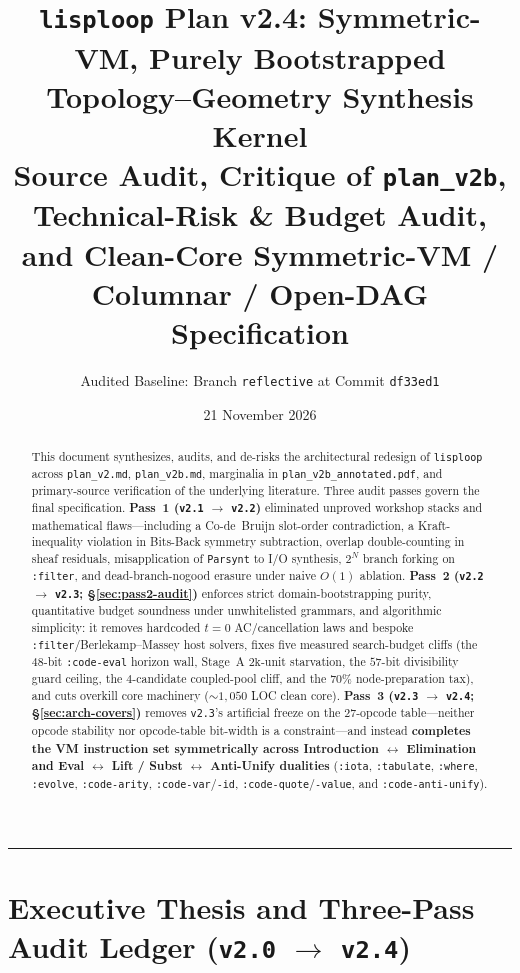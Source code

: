 \documentclass[12pt]{article}
\title{\vspace{-1.2em}\textbf{\Large \texttt{lisploop} Plan v2.4: Symmetric-VM, Purely Bootstrapped\\[0.12em] Topology--Geometry Synthesis Kernel}\\[0.35em]
\normalsize Source Audit, Critique of \texttt{plan\_v2b}, Technical-Risk \& Budget Audit,\\
and Clean-Core Symmetric-VM / Columnar / Open-DAG Specification}
\author{\normalsize Audited Baseline: Branch \texttt{reflective} at Commit \texttt{df33ed1}}
\date{21 November 2026}
\begin{document}
\maketitle

\begin{abstract}
\noindent This document synthesizes, audits, and de-risks the architectural redesign of \texttt{lisploop} across \texttt{plan\_v2.md}, \texttt{plan\_v2b.md}, marginalia in \texttt{plan\_v2b\_annotated.pdf}, and primary-source verification of the underlying literature. Three audit passes govern the final specification. \textbf{Pass~1 (\texttt{v2.1} $\to$ \texttt{v2.2})} eliminated unproved workshop stacks and mathematical flaws---including a Co-de~Bruijn slot-order contradiction, a Kraft-inequality violation in Bits-Back symmetry subtraction, overlap double-counting in sheaf residuals, misapplication of \texttt{Parsynt} to I/O synthesis, $2^N$ branch forking on \texttt{:filter}, and dead-branch-nogood erasure under naive $O(1)$ ablation. \textbf{Pass~2 (\texttt{v2.2} $\to$ \texttt{v2.3}; \S\ref{sec:pass2-audit})} enforces strict domain-bootstrapping purity, quantitative budget soundness under unwhitelisted grammars, and algorithmic simplicity: it removes hardcoded $t=0$ AC/cancellation laws and bespoke \texttt{:filter}/Berlekamp--Massey host solvers, fixes five measured search-budget cliffs (the $48$-bit \texttt{:code-eval} horizon wall, Stage~A $2\mathrm{k}$-unit starvation, the $57$-bit divisibility guard ceiling, the $4$-candidate coupled-pool cliff, and the $70\%$ node-preparation tax), and cuts overkill core machinery ($\sim 1,050$ LOC clean core). \textbf{Pass~3 (\texttt{v2.3} $\to$ \texttt{v2.4}; \S\ref{sec:arch-covers})} removes \texttt{v2.3}'s artificial freeze on the $27$-opcode table---neither opcode stability nor opcode-table bit-width is a constraint---and instead \textbf{completes the VM instruction set symmetrically across Introduction $\leftrightarrow$ Elimination and Eval $\leftrightarrow$ Lift / Subst $\leftrightarrow$ Anti-Unify dualities} (\texttt{:iota}, \texttt{:tabulate}, \texttt{:where}, \texttt{:evolve}, \texttt{:code-arity}, \texttt{:code-var}/\texttt{-id}, \texttt{:code-quote}/\texttt{-value}, and \texttt{:code-anti-unify}).
\end{abstract}

\tableofcontents
\bigskip\hrule\bigskip

\section*{Executive Thesis and Three-Pass Audit Ledger (\texttt{v2.0} $\to$ \texttt{v2.4})}
\label{sec:thesis}
\end{document}
